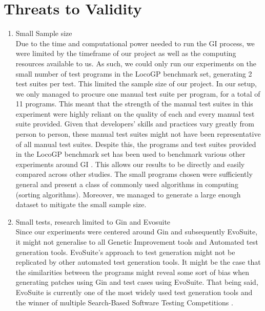 \documentclass[titlepage]{article}
\begin{document}
\section{Threats to Validity}
\begin{enumerate}
	\item Small Sample size \\
Due to the time and computational power needed to run the GI process, we were limited by the timeframe of our project as well as the computing resources available to us. As such, we could only run our experiments on the small number of test programs in the LocoGP benchmark set, generating 2 test suites per test. This limited the sample size of our project. In our setup, we only managed to procure one manual test suite per program, for a total of 11 programs. This meant that the strength of the manual test suites in this experiment were highly reliant on the quality of each and every manual test suite provided. Given that developers’ skills and practices vary greatly from person to person, these manual test suites might not have been representative of all manual test suites. Despite this, the programs and test suites provided in the LocoGP benchmark set has been used to benchmark various other experiments around GI \cite{locogp}. This allows our results to be directly and easily compared across other studies. The small programs chosen were sufficiently general and present a class of commonly used algorithms in computing (sorting algorithms). Moreover, we managed to generate a large enough dataset to mitigate the small sample size. 

	\item Small tests, research limited to Gin and Evosuite\\
Since our experiments were centered around Gin and subsequently EvoSuite, it might not generalise to all Genetic Improvement tools and Automated test generation tools. EvoSuite’s approach to test generation might not be replicated by other automated test generation tools. It might be the case that the similarities between the programs might reveal some sort of bias when generating patches using Gin and test cases using EvoSuite. That being said, EvoSuite is currently one of the most widely used test generation tools and the winner of multiple Search-Based Software Testing Competitions \cite{evosuitecompetition}.


\end{enumerate}
\end{document}
